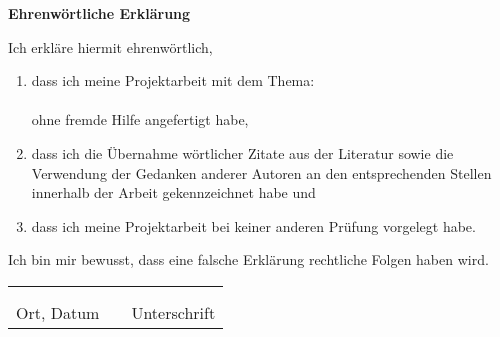 \documentclass[a4paper, 11pt]{article}
\begin{document}

\begin{center}
  \textbf{Ehrenwörtliche Erklärung}
\end{center}
\vspace*{1.5cm}
Ich erkläre hiermit ehrenwörtlich,
\begin{flushleft}
  \begin{enumerate}[leftmargin=0.5cm]
    \item 	dass ich meine {Projektarbeit}
    mit dem Thema:  \\
    \vspace*{1cm}
            \textbf{\inserttitle} \\
    \vspace*{1cm}
            ohne fremde Hilfe angefertigt habe, \\
    \item	dass ich die Übernahme wörtlicher Zitate aus der Literatur sowie die Verwendung der
            Gedanken anderer Autoren an den entsprechenden Stellen innerhalb der Arbeit gekennzeichnet habe und  \\
    \item	dass ich meine {Projektarbeit}
    bei keiner anderen Prüfung vorgelegt habe. \\
    \vspace*{1cm}
  \end{enumerate}
  \noindent
Ich bin mir bewusst, dass eine falsche Erklärung rechtliche Folgen haben wird.
\end{flushleft}
\vspace*{1cm}
\begin{tabular} {lrl}
  \hspace{5.5cm} & \hspace{3cm} & \hspace{5.5cm} \\
  \hrulefill & & \hrulefill \\
  Ort, Datum & & Unterschrift
\end{tabular}
\vspace*{\fill}
\end{document}
